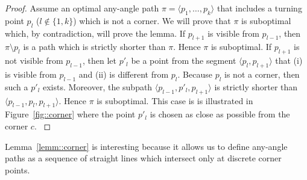 \begin{proof}
{
  Assume an optimal any-angle path $\pi = \langle p_1,\dots,p_k \rangle$ 
  that includes a turning point $p_l$ ($l \not\in \{1,k\}$) 
  which is not a corner.  
  We will prove that $\pi$ is suboptimal 
  which, by contradiction, will prove the lemma.  
  If $p_{l+1}$ is visible from $p_{l-1}$, 
  then  $\pi \setminus p_l$ is a path 
  which is strictly shorter than $\pi$.  
  Hence $\pi$ is suboptimal.  
  If $p_{l+1}$ is not visible from $p_{l-1}$, 
  then let $p'_{l}$ be a point from the segment $\langle p_l,p_{l+1} \rangle$ 
  that (i) is visible from $p_{l-1}$ 
  and (ii) is different from $p_l$.  
  Because $p_l$ is not a corner, 
  then such a $p'_l$ exists.  
  Moreover, the subpath $\langle p_{l-1}, p'_{l}, p_{l+1} \rangle$ is 
  strictly shorter than $\langle p_{l-1}, p_{l}, p_{l+1}\rangle$. 
  Hence $\pi$ is suboptimal.
  This case is is illustrated in Figure~\ref{fig::corner}  
  where the point $p'_l$ is chosen as close as possible from the corner $c$.  
}
\end{proof}
Lemma~\ref{lemm::corner} is interesting because it allows us to define 
any-angle paths as a sequence of straight lines which intersect only at
discrete corner points.
